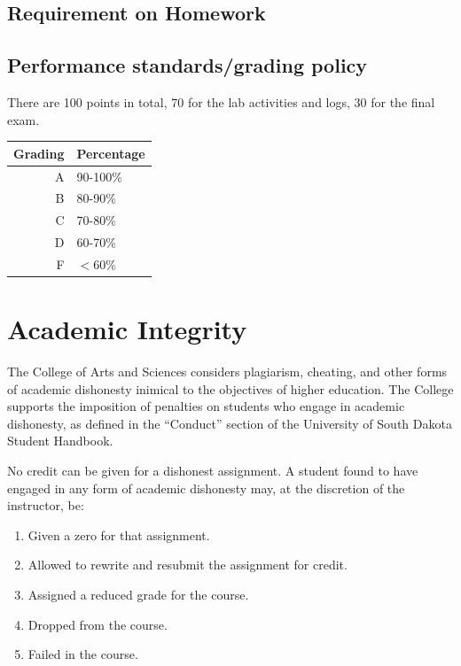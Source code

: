 \documentclass[11pt, letterpaper]{article}
\begin{document}
\subsection{Requirement on Homework}
\label{s:home}


\subsection{Performance standards/grading policy}
\label{s:grad}

There are 100 points in total, 70 for the lab activities and logs, 30 for the
final exam.

\begin{table} [htbp]
  \centering
  \label{t:grad}
  \begin{tabulary}{\linewidth}{r|l}\hline
    Grading & Percentage \\\hline
    A & 90-100\%\\
    B & 80-90\%\\
    C & 70-80\%\\
    D & 60-70\%\\
    F & $<60$\%\\
  \hline
  \end{tabulary}
\end{table}


\section{Academic Integrity}
\label{s:inte}

The College of Arts and Sciences considers plagiarism, cheating, and other
forms of academic dishonesty inimical to the objectives of higher education.
The College supports the imposition of penalties on students who engage in
academic dishonesty, as defined in the “Conduct” section of the University of
South Dakota Student Handbook.

No credit can be given for a dishonest assignment. A student found to have
engaged in any form of academic dishonesty may, at the discretion of the
instructor, be:

\begin{enumerate}[label=\textbf{\alph*.}, leftmargin=2cm]
\item Given a zero for that assignment.
\item Allowed to rewrite and resubmit the assignment for credit.
\item Assigned a reduced grade for the course.
\item Dropped from the course.
\item Failed in the course.
\end{enumerate}
\end{document}
